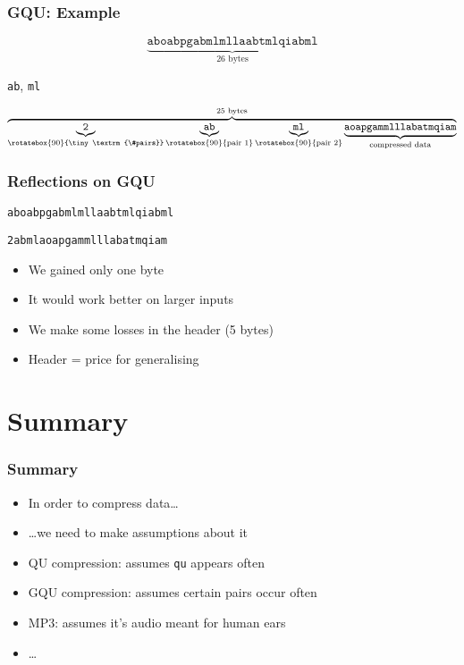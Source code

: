 \begin{frame}
  \frametitle{GQU: Example}
  \[
    \underbrace{\texttt{aboabpgabmlmllaabtmlqiabml}}_{\textrm{26 bytes}}
  \]
  \vskip5mm
  \begin{center}
    \texttt{ab}, \texttt{ml}
  \end{center}
  \vskip5mm
  \[
    \overbrace{
      \underbrace{\texttt{2}}_{\rotatebox{90}{\tiny\textrm{\#pairs}}}
      \underbrace{\texttt{ab}}_{\rotatebox{90}{\tiny\textrm{pair 1}}}
      \underbrace{\texttt{ml}}_{\rotatebox{90}{\tiny\textrm{pair 2}}}
      \underbrace{\texttt{aoapgammlllabatmqiam}}_{\tiny\textrm{compressed data}}}
    ^{\textrm{25 bytes}}
  \]
\end{frame}

\begin{frame}
  \frametitle{Reflections on GQU}
  \begin{center}
    \texttt{aboabpgabmlmllaabtmlqiabml}
  \end{center}
  \begin{center}
    \texttt{2abmlaoapgammlllabatmqiam}
  \end{center}
  \begin{itemize}
    \item We gained only one byte
    \item It would work better on larger inputs
    \item We make some losses in the header (5 bytes)
    \item Header = price for generalising
  \end{itemize}
\end{frame}

\section{Summary}

\begin{frame}
  \tableofcontents[currentsection]
\end{frame}

\begin{frame}
  \frametitle{Summary}
  \begin{itemize}
    \item In order to compress data\dots
    \item \dots we need to make assumptions about it
    \item QU compression: assumes {\tt qu} appears often
    \item GQU compression: assumes certain pairs occur often
    \item MP3: assumes it's audio meant for human ears
    \item \dots
  \end{itemize}
\end{frame}

